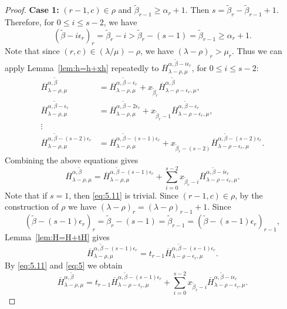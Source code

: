 \documentclass[12pt]{amsart}
\numberwithin{equation}{section}
\theoremstyle{definition}
\newcommand\wb{\widetilde{\beta}}
\newcommand\ovH{\overline{H}}
\newcommand\lm{{\lambda/\mu}}
\begin{document}
\begin{proof}
  \textbf{Case 1:} $(r-1,c)\in\rho$ and $\wb_{r-1}\ge\alpha_r+1$. Then
  $s=\wb_r-\wb_{r-1}+1$. Therefore, for $0\le i\le s-2$, we have
\[
(\wb-i\epsilon_r)_r =\wb_r-i > \wb_r -(s-1) = \wb_{r-1}\ge \alpha_r +1.
\]
Note that since $(r,c)\in (\lm)-\rho$, we have $(\lambda-\rho)_r>\mu_r$.
Thus we can apply Lemma~\ref{lem:h=h+xh} repeatedly to
$\ovH^{\alpha,\wb-i\epsilon_r}_{\lambda-\rho,\mu}$, for $0\le i\le s-2$:
\begin{align*}
  \ovH^{\alpha,\wb}_{\lambda-\rho,\mu} &=
  \ovH^{\alpha,\wb-\epsilon_r}_{\lambda-\rho,\mu}
  + x_{\wb_r}\ovH^{\alpha,\wb}_{\lambda-\rho-\epsilon_r,\mu},\\
  \ovH^{\alpha,\wb-\epsilon_r}_{\lambda-\rho,\mu} &=
  \ovH^{\alpha,\wb-2\epsilon_r}_{\lambda-\rho,\mu}
  + x_{\wb_r-1}\ovH^{\alpha,\wb-\epsilon_r}_{\lambda-\rho-\epsilon_r,\mu},\\
  \vdots \\
  \ovH^{\alpha,\wb-(s-2)\epsilon_r}_{\lambda-\rho,\mu} &=
  \ovH^{\alpha,\wb-(s-1)\epsilon_r}_{\lambda-\rho,\mu}
  + x_{\wb_r-(s-2)}\ovH^{\alpha,\wb-(s-2)\epsilon_r}_{\lambda-\rho-\epsilon_r,\mu}.
\end{align*}
Combining the above equations gives
\begin{equation}\label{eq:5.11}
  \ovH^{\alpha,\wb}_{\lambda-\rho,\mu} =
  \ovH^{\alpha,\wb-(s-1)\epsilon_r}_{\lambda-\rho,\mu}
  +\sum_{i=0}^{s-2} x_{\wb_r-i}
  \ovH^{\alpha,\wb-i\epsilon_r}_{\lambda-\rho-\epsilon_r,\mu}.
\end{equation}
Note that if $s=1$, then \eqref{eq:5.11} is trivial. Since $(r-1,c)\in\rho$, by
the construction of $\rho$ we have $(\lambda-\rho)_r = (\lambda-\rho)_{r-1}+1$.
Since
\[
(\wb-(s-1)\epsilon_r)_r = \wb_r-(s-1)= \wb_{r-1} = (\wb-(s-1)\epsilon_r)_{r-1},
\]
Lemma~\ref{lem:H=H+tH} gives
\begin{equation}
  \label{eq:5}
  \ovH^{\alpha,\wb-(s-1)\epsilon_r}_{\lambda-\rho,\mu}  = t_{r-1}
  \ovH^{\alpha,\wb-(s-1)\epsilon_r}_{\lambda-\rho-\epsilon_r,\mu}.
\end{equation}
By \eqref{eq:5.11} and \eqref{eq:5} we obtain 
\begin{equation}
  \label{eq:6}
  \ovH^{\alpha,\wb}_{\lambda-\rho,\mu} = t_{r-1}
  \ovH^{\alpha,\wb-(s-1)\epsilon_r}_{\lambda-\rho-\epsilon_r,\mu}
  +\sum_{i=0}^{s-2} x_{\wb_r-i}
  \ovH^{\alpha,\wb-i\epsilon_r}_{\lambda-\rho-\epsilon_r,\mu}.
\end{equation}


\end{proof}
\end{document}
